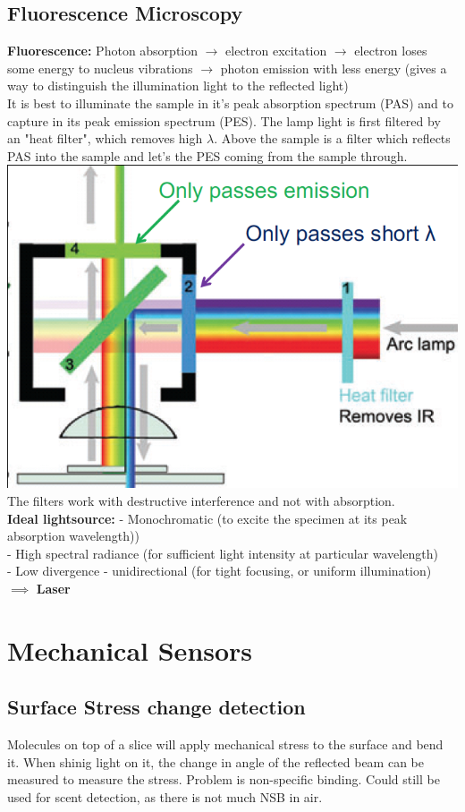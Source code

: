 \documentclass[9pt]{article}
\begin{document}
\begin{multicols}{2}
\subsection{Fluorescence Microscopy}
\textbf{Fluorescence:} Photon absorption $\rightarrow$ electron excitation $\rightarrow$ electron loses some energy to nucleus vibrations $\rightarrow$ photon emission with less energy (gives a way to distinguish the illumination light to the reflected light)\\
It is best to illuminate the sample in it's peak absorption spectrum (PAS) and to capture in its peak emission spectrum (PES). The lamp light is first filtered by an "heat filter", which removes high $\lambda$. Above the sample is a filter which reflects PAS into the sample and let's the PES coming from the sample through.\\
\includegraphics[scale=0.2]{Images/epi_setup.png}
The filters work with destructive interference and not with absorption.\\
\textbf{Ideal lightsource:} - Monochromatic (to excite the specimen at its peak absorption wavelength))\\
- High spectral radiance (for sufficient light intensity at particular wavelength)\\
- Low divergence - unidirectional (for tight focusing, or uniform illumination)\\
$\implies$ \textbf{Laser}
\section{Mechanical Sensors}	
\subsection{Surface Stress change detection}
Molecules on top of a slice will apply mechanical stress to the surface and bend it. When shinig light on it, the change in angle of the reflected beam can be measured to measure the stress. Problem is non-specific binding. Could still be used for scent detection, as there is not much NSB in air.\\

\end{multicols}
\end{document}
